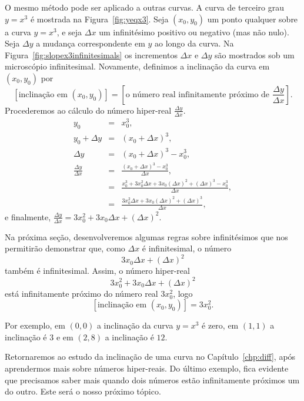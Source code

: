 O mesmo método pode ser aplicado a outras curvas. A curva de
terceiro grau $y = x^3$ é mostrada na Figura~\ref{fig:yeqx3}.
Seja $(x_0,y_0)$ um ponto qualquer sobre a curva $y = x^3$,
e seja $\Delta x$ um infinitésimo positivo ou negativo (mas
não nulo). Seja $\Delta y$ a mudança correspondente em $y$ ao
longo da curva. Na Figura~\ref{fig:slopex3infinitesimals} os
incrementos $\Delta x$ e $\Delta y$ são mostrados sob um
microscópio infinitesimal. Novamente, definimos a inclinação da
curva em $(x_0,y_0)$ por
\[
  [\text{inclinação em } (x_0,y_0)] =
  \left[ \text{o número real infinitamente próximo de } \frac{\Delta y}{\Delta x} \right].
\]
Procederemos ao cálculo do número hiper-real
$\displaystyle \frac{\Delta y}{\Delta x}.$
\begin{eqnarray*}
             y_0 & = & x_0^3, \\
  y_0 + \Delta y & = & (x_0 + \Delta x)^3, \\
        \Delta y & = & (x_0 + \Delta x)^3 - x_0^3, \\
  \frac{\Delta y}{\Delta x}
                 & = & \frac{(x_0 + \Delta x)^3 - x_0^3}
                            {\Delta x}, \\
                 & = & \frac{x_0^3 + 3 x_0^2 \Delta x + 3x_0(\Delta x)^2
                             + (\Delta x)^3 - x_0^3}
                            {\Delta x}, \\
                 & = & \frac{3 x_0^2 \Delta x + 3x_0(\Delta x)^2
                             + (\Delta x)^3}
                            {\Delta x},
\end{eqnarray*}
e finalmente, \SPC $\displaystyle \frac{\Delta y}{\Delta x} =
3x_0^2 + 3x_0 \Delta x + (\Delta x)^2.$

Na próxima seção, desenvolveremos algumas regras sobre
infinitésimos que nos permitirão demonstrar que, como
$\Delta x$ é infinitesimal, o número
\[
  3x_0\Delta x + (\Delta x)^2
\]
também é infinitesimal. Assim, o número hiper-real
\[
  3 x_0^2 + 3 x_0 \Delta x + (\Delta x)^2
\]
está infinitamente próximo do número real $3x_0^2$, logo
\[
  [\text{inclinação em } (x_0,y_0)] = 3 x_0^2.
\]

Por exemplo, em $(0,0)$ a inclinação da curva $y = x^3$ é
zero, em $(1,1)$ a inclinação é $3$ e em $(2,8)$ a inclinação
é $12$.

Retornaremos ao estudo da inclinação de uma curva no
Capítulo~\ref{chp:diff}, após aprendermos mais sobre
números hiper-reais. Do último exemplo, fica evidente que
precisamos saber mais quando dois números estão infinitamente
próximos um do outro. Este será o nosso próximo tópico.

